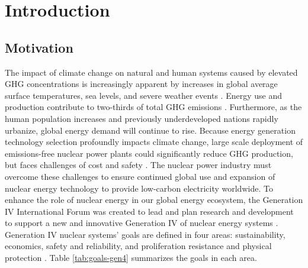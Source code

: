 \chapter{Introduction}
\label{chap:intro}


\section{Motivation}
The impact of climate change on natural and human systems caused by 
elevated \gls{GHG} concentrations is increasingly apparent by increases 
in global average surface temperatures, sea levels, and severe weather events 
\cite{noauthor_climate_2018}.
Energy use and production contribute to two-thirds of total \gls{GHG}
emissions \cite{noauthor_climate_2018}.
Furthermore, as the human population increases and previously underdeveloped 
nations rapidly urbanize, global energy demand will continue to rise.  
Because energy generation technology selection profoundly impacts climate change, 
large scale deployment of emissions-free nuclear power plants could 
significantly reduce GHG production, but faces challenges of cost and safety 
\cite{noauthor_climate_2018, petti_future_2018}. 
The nuclear power industry must overcome these challenges to ensure continued 
global use and expansion of nuclear energy technology to provide low-carbon 
electricity worldwide.
To enhance the role of nuclear energy in our global energy 
ecosystem, the Generation IV International Forum was created to lead and plan 
research and development to support a new and innovative Generation IV of
nuclear energy systems \cite{gif_technology_2002}.
Generation IV nuclear systems' goals are defined in four areas: sustainability, 
economics, safety and reliability, and proliferation resistance and physical 
protection \cite{gif_technology_2002}. 
Table \ref{tab:goals-gen4} summarizes the goals in each area. 

